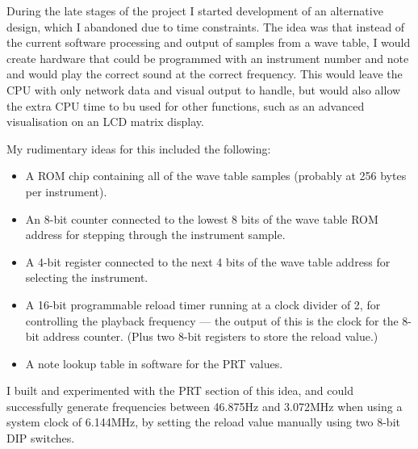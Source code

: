 During the late stages of the project I started development of an alternative design, which I 
abandoned due to time constraints.  The idea was that instead of the current software processing and 
output of samples from a wave table, I would create hardware that could be programmed with an 
instrument number and note and would play the correct sound at the correct frequency.   This would 
leave the CPU with only network data and visual output to handle, but would also allow the extra CPU 
time to bu used for other functions, such as an advanced visualisation on an LCD matrix display.

My rudimentary ideas for this included the following:

\begin{itemize}
\item A ROM chip containing all of the wave table samples (probably at 256 bytes per instrument).
\item An 8-bit counter connected to the lowest 8 bits of the wave table ROM address for stepping 
through the instrument sample.
\item A 4-bit register connected to the next 4 bits of the wave table address for selecting the 
instrument.
\item A 16-bit programmable reload timer running at a clock divider of 2, for controlling the 
playback frequency --- the output of this is the clock for the 8-bit address counter.  (Plus two 
8-bit registers to store the reload value.)
\item A note lookup table in software for the PRT values.
\end{itemize}

I built and experimented with the PRT section of this idea, and could successfully generate 
frequencies between 46.875Hz and 3.072MHz when using a system clock of 6.144MHz, by setting the 
reload value manually using two 8-bit DIP switches.
